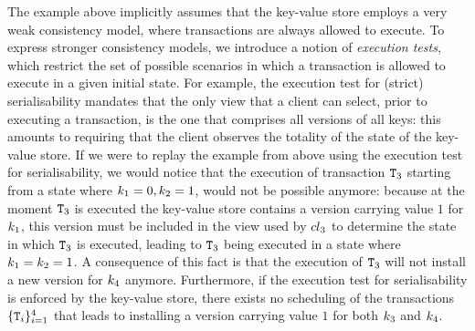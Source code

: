 The example above implicitly assumes that the key-value store employs a very weak consistency model, 
where transactions are always allowed to execute. To express stronger consistency models, 
we introduce a notion of \emph{execution tests}, which restrict the set of possible scenarios in which 
a transaction is allowed to execute in a given initial state. For example, the execution test for 
(strict) serialisability mandates that the only view that a client can select, prior to executing a transaction, 
is the one that comprises all versions of all keys: this amounts to requiring that the client observes the totality 
of the state of the key-value store. If we were to replay the example from above using the execution test 
for serialisability, we would notice that the execution of transaction $\mathtt{T}_3$ starting from a state 
where $k_1 = 0, k_2 = 1$, would not be possible anymore: because at the moment $\mathtt{T}_3$ is 
executed the key-value store contains a version carrying value $1$ for $k_1$, this version must be 
included in the view used by ${cl}_3$ to determine the state in which $\mathtt{T}_3$ is executed, leading 
to $\mathtt{T}_3$ being executed in a state where $k_1 = k_2 = 1$. A consequence of this fact is 
that the execution of $\mathtt{T}_3$ will not install a new version for $k_4$ anymore. Furthermore, 
if the execution test for serialisability is enforced by the key-value store, there exists no scheduling 
of the transactions $\{\mathtt{T}_i\}_{i=1}^{4}$ that leads to installing a version carrying value 
$1$ for both $k_3$ and $k_4$.

%


